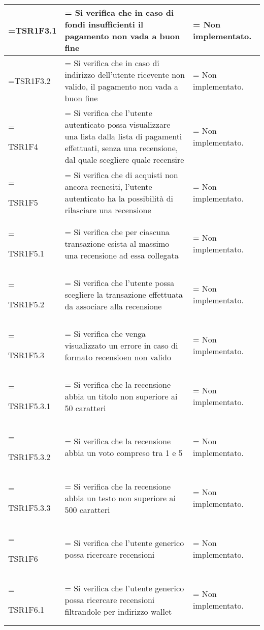 \begin{xltabular}{\textwidth} {
        >{\hsize\linewidth=\hsize}X
        >{\hsize\linewidth=\hsize}X
        >{\hsize\linewidth=\hsize}X
    }
    TSR1F3.1&
    Si verifica che in caso di fondi insufficienti il pagamento non vada a buon fine&
    Non implementato.
    \\ \hline
    
    TSR1F3.2&
    Si verifica che in caso di indirizzo dell'utente ricevente non valido, il pagamento non vada a buon fine&
    Non implementato.
    \\ \hline
    
    TSR1F4&
    Si verifica che l'utente autenticato possa visualizzare una lista dalla lista di pagamenti effettuati, senza una recensione, dal quale scegliere quale recensire&
    Non implementato.
    \\ \hline

    TSR1F5&
    Si verifica che di acquisti non ancora recnesiti, l'utente autenticato ha la possibilità di rilasciare una recensione&
    Non implementato.
    \\ \hline

    TSR1F5.1&
    Si verifica che per ciascuna transazione esista al massimo una recensione ad essa collegata&
    Non implementato.
    \\ \hline
    
    TSR1F5.2&
    Si verifica che l'utente possa scegliere la transazione effettuata da associare alla recensione&
    Non implementato.
    \\ \hline

    TSR1F5.3&
    Si verifica che venga visualizzato un errore in caso di formato recensioen non valido&
    Non implementato.
    \\ \hline
    
    TSR1F5.3.1&
    Si verifica che la recensione abbia un titolo non superiore ai 50 caratteri&
    Non implementato.
    \\ \hline

    TSR1F5.3.2&
    Si verifica che la recensione abbia un voto compreso tra 1 e 5&
    Non implementato.
    \\ \hline

    TSR1F5.3.3&
    Si verifica che la recensione abbia un testo non superiore ai 500 caratteri&
    Non implementato.
    \\ \hline

    TSR1F6&
    Si verifica che l'utente generico possa ricercare recensioni&
    Non implementato.
    \\ \hline

    TSR1F6.1&
    Si verifica che l'utente generico possa ricercare recensioni filtrandole per indirizzo wallet&
    Non implementato.
    \\ \hline
    

\end{xltabular}
